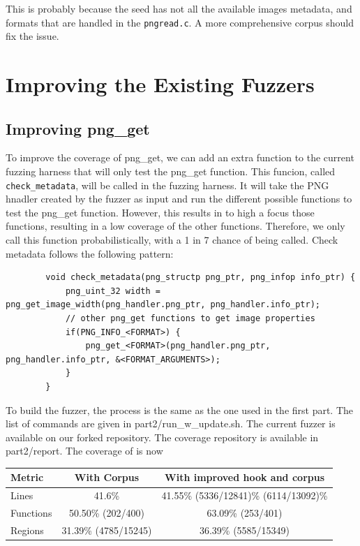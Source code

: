\documentclass[11pt]{article}
\begin{document}
    This is probably because the seed has not all the available images metadata, and formats that are handled in the \texttt{pngread.c}. A more comprehensive corpus should fix the issue.

    \section{Improving the Existing Fuzzers}

    \subsection{Improving png\_get}

    To improve the coverage of png\_get, we can add an extra function to the current fuzzing harness that will only    test the png\_get function. This funcion, called \texttt{check\_metadata}, will be called in the fuzzing harness.
    It will take the PNG hnadler created by the fuzzer as input and run the different possible functions to test the png\_get function.
    However, this results in to high a focus those functions, resulting in a low coverage of the other functions.
    Therefore, we only call this function probabilistically, with a 1 in 7 chance of being called. Check metadata follows
    the following pattern:
    \begin{lstlisting}
        void check_metadata(png_structp png_ptr, png_infop info_ptr) {
            png_uint_32 width = png_get_image_width(png_handler.png_ptr, png_handler.info_ptr);
            // other png_get functions to get image properties
            if(PNG_INFO_<FORMAT>) {
                png_get_<FORMAT>(png_handler.png_ptr, png_handler.info_ptr, &<FORMAT_ARGUMENTS>);
            }
        }
    \end{lstlisting}

    To build the fuzzer, the process is the same as the one used in the first part. The list of commands are given in
    part2/run\_w\_update.sh. The current fuzzer is available on our forked repository. The coverage repository
    is available in part2/report. The coverage of is now
    \begin{center}
        \begin{tabular}{ | l | c | c | }
            \hline
            \textbf{Metric} & \textbf{With Corpus} & \textbf{With improved hook and corpus} \\
            \hline
            Lines & 41.6\%  & 41.55\% (5336/12841)\% (6114/13092)\% \\
            Functions &  50.50\% (202/400) &   63.09\% (253/401)  \\
            Regions &  31.39\% (4785/15245) & 36.39\% (5585/15349)  \\
            \hline
        \end{tabular}
        
    \end{center}
\end{document}
